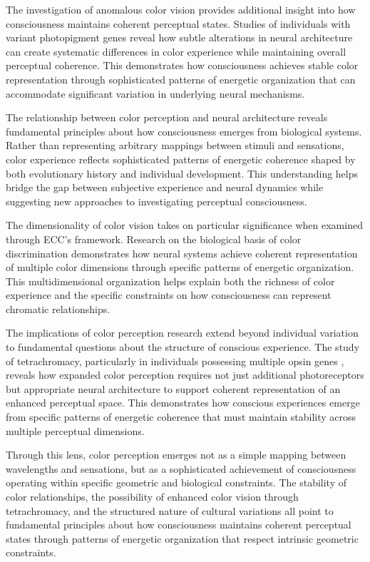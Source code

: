 The investigation of anomalous color vision provides additional insight into how consciousness maintains coherent perceptual states. Studies of individuals with variant photopigment genes \cite{Jordan2010} reveal how subtle alterations in neural architecture can create systematic differences in color experience while maintaining overall perceptual coherence. This demonstrates how consciousness achieves stable color representation through sophisticated patterns of energetic organization that can accommodate significant variation in underlying neural mechanisms.

The relationship between color perception and neural architecture reveals fundamental principles about how consciousness emerges from biological systems. Rather than representing arbitrary mappings between stimuli and sensations, color experience reflects sophisticated patterns of energetic coherence shaped by both evolutionary history and individual development. This understanding helps bridge the gap between subjective experience and neural dynamics while suggesting new approaches to investigating perceptual consciousness.

The dimensionality of color vision takes on particular significance when examined through ECC's framework. Research on the biological basis of color discrimination \cite{Jacobs2018} demonstrates how neural systems achieve coherent representation of multiple color dimensions through specific patterns of energetic organization. This multidimensional organization helps explain both the richness of color experience and the specific constraints on how consciousness can represent chromatic relationships.

The implications of color perception research extend beyond individual variation to fundamental questions about the structure of conscious experience. The study of tetrachromacy, particularly in individuals possessing multiple opsin genes \cite{Jameson2001}, reveals how expanded color perception requires not just additional photoreceptors but appropriate neural architecture to support coherent representation of an enhanced perceptual space. This demonstrates how conscious experiences emerge from specific patterns of energetic coherence that must maintain stability across multiple perceptual dimensions.

Through this lens, color perception emerges not as a simple mapping between wavelengths and sensations, but as a sophisticated achievement of consciousness operating within specific geometric and biological constraints. The stability of color relationships, the possibility of enhanced color vision through tetrachromacy, and the structured nature of cultural variations all point to fundamental principles about how consciousness maintains coherent perceptual states through patterns of energetic organization that respect intrinsic geometric constraints.

